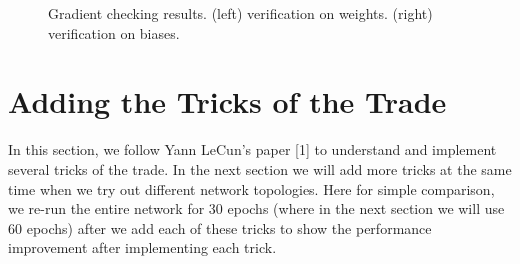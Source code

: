 \documentclass{article} %
\begin{document}
\begin{figure} [!htbp]
	
	\caption{Gradient checking results. (left) verification on weights. (right) verification on biases. }  
	\label{fig:check}
\end{figure}

\section{Adding the Tricks of the Trade}
In this section, we follow Yann LeCun's paper [1] to understand and implement several tricks of the trade. In the next section we will add more tricks at the same time when we try out different network topologies. Here for simple comparison, we re-run the entire network for 30 epochs (where in the next section we will use 60 epochs) after we add each of these tricks to show the performance improvement after implementing each trick. 
\end{document}
